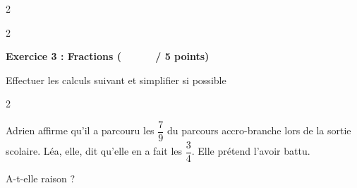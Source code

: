 \documentclass[12pt,a4paper]{exam}
\begin{document}
\begin{questions}
\begin{multicols}{2}
    \end{multicols}
    \begin{multicols}{2}
    \end{multicols}
    
\end{questions}

\vspace{20pt}

\noindent
\textbf{Exercice 3 : Fractions (\ \ \ \ \ \  / 5 points)}
\vspace{5pt}

\begin{questions}

    \question[2] Effectuer les calculs suivant et simplifier si possible
    \begin{multicols}{2}
    \end{multicols}

    \vspace{5pt}
    
    \question[3] Adrien affirme qu'il a parcouru les $\dfrac{7}{9}$ du parcours accro-branche lors 
    de la sortie scolaire. Léa, elle, dit qu'elle en a fait les $\dfrac{3}{4}$. Elle prétend l'avoir battu. 
    \vspace{5pt}
    
    A-t-elle raison ?

\end{questions}
\end{document}
